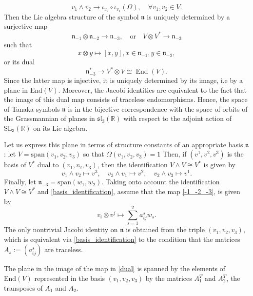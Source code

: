 \documentclass[11pt,letterpaper]{amsart}
\numberwithin{equation}{section}
\begin{document}
$$v_1\wedge v_2 \to  \iota_{v_2}\circ \iota_{v_1} (\Omega), \quad \forall v_1, v_2\in V.$$ Then the Lie algebra structure of the symbol $\mathfrak{n}$ is uniquely determined by a surjective map
\begin{equation}
\label{-1_-2_-3}
\mathfrak{n}_{-1} \otimes \mathfrak{n}_{-2} \to 
\mathfrak{n}_{-3}, \quad \text{or} \quad V \otimes V^* \to 
\mathfrak{n}_{-3}
\end{equation}
such that 
\begin{equation}
\label{Levi}
x\otimes y\mapsto [x, y], x\in \mathfrak {n}_{-1}, y\in \mathfrak{n}_{-2},
\end{equation}
or its dual 
\begin{equation}
\label{dual}
\mathfrak{n}_{-3}^*\to V^* \otimes V \cong \operatorname{End}(V).
\end{equation}
Since the latter map is injective, it is uniquely determined by its image, i.e by a plane in $\mathrm{End}(V)$. Moreover, the Jacobi identities are equivalent to the fact that the image of this dual map consists of traceless endomorphisms. Hence, the space of Tanaka symbols $\mathfrak{n}$ is in the bijective correspondence with the space of orbits of the Grassmannian of planes in $\mathfrak{sl}_3(\mathbb R)$  with respect to the adjoint action of $\mathrm{SL}_3(\mathbb R)$ on its Lie algebra.

Let us express this plane in terms of structure constants of an appropriate basis $\mathfrak n$: let $V=\mathrm{span} (v_1, v_2, v_3)$ so that $\Omega(v_1, v_2, v_3)=1$
Then, if $(v^1,v^2, v^3)$ is the basis of $V^*$ dual to $(v_1, v_2, v_3)$, then  the identification $ V \wedge V \cong V^*$ is given by 
\begin{equation}
\label{basis_identification}
v_1\wedge v_2 \mapsto v^3, \quad v_3\wedge v_1\mapsto v^2, \quad v_2\wedge v_3\mapsto v^1.    
\end{equation}
Finally, let $\mathfrak{n}_{-3}=\mathrm{span}(w_1, w_2)$. Taking onto account the identification $ V \wedge V \cong V^*$ and \eqref{basis_identification}, assume that the map  \eqref{-1_-2_-3}, is given by 
\[ v_i\otimes v^j\mapsto \sum_{s=1}^2 a_{ij}^s w_s.\]
The only nontrivial Jacobi identity on $\mathfrak n$ is obtained from the triple $(v_1,v_2,v_3)$, which is equivalent via \eqref{basis_identification} to the condition that the matrices $A_s:=(a_{ij}^s)$ are traceless.

The plane in the image of the map in \eqref{dual} is spanned by the elements of $\mathrm{End}(V)$ represented in the basis $(v_1, v_2, v_3)$ by the matrices $A_1^T$ and $A_2^T$, the transposes of $A_1$ and $A_2$.
\end{document}
